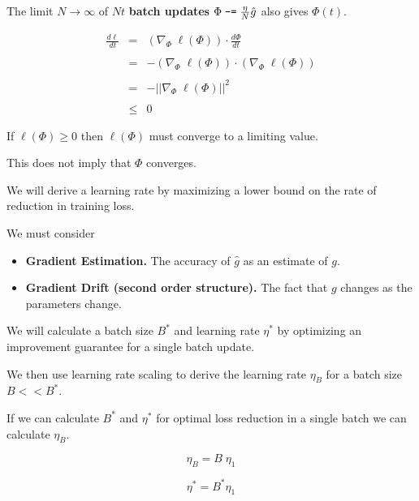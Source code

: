 {\vfill
The limit $N \rightarrow \infty$ of $Nt$ {\bf batch updates} $\Phi\; \mbox{\tt -=} \; \frac{\eta}{N} \hat{g}$ also gives $\Phi(t)$.


\begin{eqnarray*}
  \frac{d \ell}{d t} & = & (\nabla_\Phi \;\ell(\Phi)) \cdot \frac{d \Phi}{dt} \\
  \\
  & = & - (\nabla_\Phi \;\ell(\Phi)) \cdot (\nabla_\Phi \;\ell(\Phi)) \\
  \\
  & = & - ||\nabla_\Phi \;\ell(\Phi)||^2 \\
  \\
  & \leq & 0
\end{eqnarray*}

\vfill
If $\ell(\Phi) \geq 0$ then $\ell(\Phi)$ must converge to a limiting value.

\vfill
This does not imply that $\Phi$ converges.


\vfill
We will derive a learning rate by maximizing a lower bound on the rate of reduction in training loss.

\vfill
We must consider

\vfill
\begin{itemize}
\item {\bf Gradient Estimation.} The accuracy of $\hat{g}$ as an estimate of $g$.

  \vfill
\item {\bf Gradient Drift (second order structure).} The fact that $g$ changes as the parameters change.
\end{itemize}


We will calculate a batch size $B^*$ and learning rate $\eta^*$ by optimizing an improvement guarantee for a single batch update.

\vfill
We then use learning rate scaling to derive the learning rate  $\eta_B$ for a batch size $B << B^*$.


If we can calculate $B^*$ and $\eta^*$ for optimal loss reduction in a single batch
we can calculate $\eta_B$.

\vfill
$$\eta_B = B\;\eta_1$$

\vfill
$$\eta^* = B^* \eta_1$$

}
